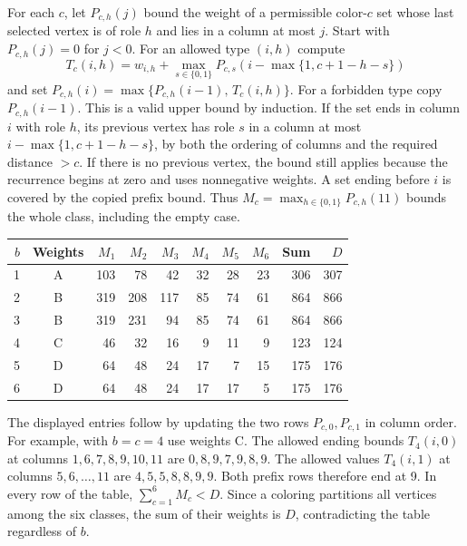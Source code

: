 \documentclass[11pt]{article}
\begin{document}
For each \(c\), let \(P_{c,h}(j)\) bound the weight of a permissible color-\(c\) set whose last selected vertex is of role \(h\) and lies in a column at most \(j\). Start with \(P_{c,h}(j)=0\) for \(j<0\). For an allowed type \((i,h)\) compute
\[
T_c(i,h)=w_{i,h}+
\max_{s\in\{0,1\}}P_{c,s}\!\left(i-\max\{1,c+1-h-s\}\right)
\]
and set \(P_{c,h}(i)=\max\{P_{c,h}(i-1),\,T_c(i,h)\}\). For a forbidden type copy \(P_{c,h}(i-1)\). This is a valid upper bound by induction. If the set ends in column \(i\) with role \(h\), its previous vertex has role \(s\) in a column at most \(i-\max\{1,c+1-h-s\}\), by both the ordering of columns and the required distance \(>c\). If there is no previous vertex, the bound still applies because the recurrence begins at zero and uses nonnegative weights. A set ending before \(i\) is covered by the copied prefix bound. Thus \(M_c=\max_{h\in\{0,1\}}P_{c,h}(11)\) bounds the whole class, including the empty case.

\begin{center}\small
\begin{tabular}{@{}rcrrrrrrrr@{}}
\toprule
\(b\) & Weights & \(M_1\) & \(M_2\) & \(M_3\) & \(M_4\) & \(M_5\) & \(M_6\) & Sum & \(D\)\\
\midrule
1 & A & 103 & 78 & 42 & 32 & 28 & 23 & 306 & 307\\
2 & B & 319 & 208 & 117 & 85 & 74 & 61 & 864 & 866\\
3 & B & 319 & 231 & 94 & 85 & 74 & 61 & 864 & 866\\
4 & C & 46 & 32 & 16 & 9 & 11 & 9 & 123 & 124\\
5 & D & 64 & 48 & 24 & 17 & 7 & 15 & 175 & 176\\
6 & D & 64 & 48 & 24 & 17 & 17 & 5 & 175 & 176\\
\bottomrule
\end{tabular}
\end{center}

The displayed entries follow by updating the two rows \(P_{c,0},P_{c,1}\) in column order. For example, with \(b=c=4\) use weights C. The allowed ending bounds \(T_4(i,0)\) at columns \(1,6,7,8,9,10,11\) are \(0,8,9,7,9,8,9\). The allowed values \(T_4(i,1)\) at columns \(5,6,\ldots,11\) are \(4,5,5,8,8,9,9\). Both prefix rows therefore end at 9. In every row of the table, \(\sum_{c=1}^6 M_c<D\). Since a coloring partitions all vertices among the six classes, the sum of their weights is \(D\), contradicting the table regardless of \(b\).
\end{document}

